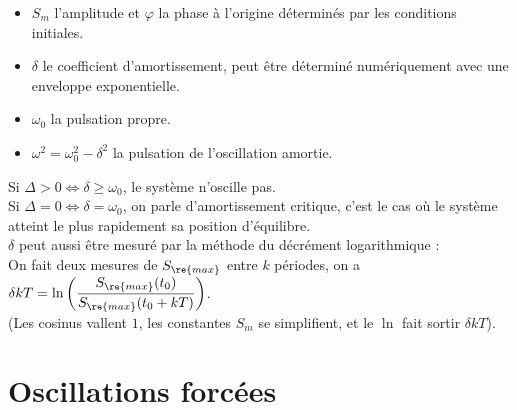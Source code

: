 \documentclass[13pt, twoside, a4paper, french]{report}
\begin{document}

        \begin{itemize}
            \item $S_m$ l'amplitude et $\varphi$ la phase à l'origine déterminés par les conditions initiales.
            \item $\delta$ le coefficient d'amortissement, peut être déterminé numériquement avec une enveloppe exponentielle.
            \item $\omega_0$ la pulsation propre.
            \item $\omega^2 = \omega_0^2 - \delta^2$ la pulsation de l'oscillation amortie.
        \end{itemize}
        \vspace{7pt}
        Si $\Delta > 0 \iff \delta \ge \omega_0$, le système n'oscille pas.\\
        Si $\Delta = 0 \iff \delta = \omega_0$, on parle d'amortissement critique, c'est le cas où le système atteint le plus rapidement sa position d'équilibre.\\

        $\delta$ peut aussi être mesuré par la méthode du décrément logarithmique :\\
        On fait deux mesures de $S_\re{max}$ entre $k$ périodes, on a $\delta k T = \ln\left(\dfrac{S_\re{max}(t_0)}{S_\re{max}(t_0 + kT)}\right)$.\\
        (Les cosinus vallent $1$, les constantes $S_m$ se simplifient, et le $\ln$ fait sortir $\delta k T$).


    \section{Oscillations forcées}
\end{document}
